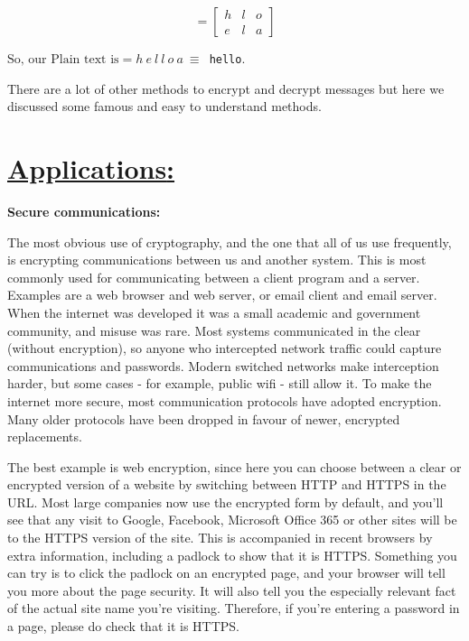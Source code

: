 \documentclass[a4paper,12pt]{article}
\begin{document}
        $$= \begin{bmatrix}
            h & l & o \\
            e & l & a
        \end{bmatrix}$$

        \vspace*{0.5cm}

        $\mbox{So, our Plain text is} = h\ e\ l\ l\ o\ a \ \equiv $\ \texttt{hello}. 

        \vspace*{0.8cm}

        There are a lot of other methods to encrypt and decrypt messages but here we discussed some famous and easy to understand methods.

        \pagebreak

        \section*{\underline{{\bf Applications}:}}

        \large{{\bf Secure communications:}}  

        \vspace*{0.5cm}


        The most obvious use of cryptography, and the one that all of us use frequently, is encrypting communications between us and another system. This is most commonly used for communicating between a client program and a server. Examples are a web browser and web server, or email client and email server. When the internet was developed it was a small academic and government community, and misuse was rare. Most systems communicated in the clear (without encryption), so anyone who intercepted network traffic could capture communications and passwords. Modern switched networks make interception harder, but some cases - for example, public wifi - still allow it. To make the internet more secure, most communication protocols have adopted encryption. Many older protocols have been dropped in favour of newer, encrypted replacements.

        \vspace*{0.4cm}

        The best example is web encryption, since here you can choose between a clear or encrypted version of a website by switching between HTTP and HTTPS in the URL. Most large companies now use the encrypted form by default, and you'll see that any visit to Google, Facebook, Microsoft Office 365 or other sites will be to the HTTPS version of the site. This is accompanied in recent browsers by extra information, including a padlock to show that it is HTTPS. Something you can try is to click the padlock on an encrypted page, and your browser will tell you more about the page security. It will also tell you the especially relevant fact of the actual site name you're visiting. Therefore, if you're entering a password in a page, please do check that it is HTTPS.
\end{document}
